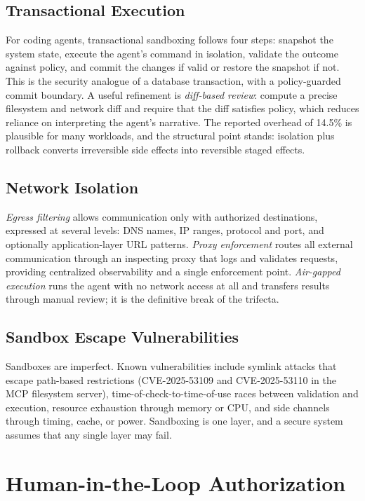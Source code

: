 \documentclass[11pt]{book}
\begin{document}
\subsection{Transactional Execution}

For coding agents, transactional sandboxing \cite{sandbox2025} follows four steps: snapshot the system state, execute the agent's command in isolation, validate the outcome against policy, and commit the changes if valid or restore the snapshot if not. This is the security analogue of a database transaction, with a policy-guarded commit boundary. A useful refinement is \textit{diff-based review}: compute a precise filesystem and network diff and require that the diff satisfies policy, which reduces reliance on interpreting the agent's narrative. The reported overhead of 14.5\% is plausible for many workloads, and the structural point stands: isolation plus rollback converts irreversible side effects into reversible staged effects.

\subsection{Network Isolation}

\textit{Egress filtering} allows communication only with authorized destinations, expressed at several levels: DNS names, IP ranges, protocol and port, and optionally application-layer URL patterns. \textit{Proxy enforcement} routes all external communication through an inspecting proxy that logs and validates requests, providing centralized observability and a single enforcement point. \textit{Air-gapped execution} runs the agent with no network access at all and transfers results through manual review; it is the definitive break of the trifecta.

\subsection{Sandbox Escape Vulnerabilities}

Sandboxes are imperfect. Known vulnerabilities include symlink attacks that escape path-based restrictions (CVE-2025-53109 and CVE-2025-53110 in the MCP filesystem server), time-of-check-to-time-of-use races between validation and execution, resource exhaustion through memory or CPU, and side channels through timing, cache, or power. Sandboxing is one layer, and a secure system assumes that any single layer may fail.

\section{Human-in-the-Loop Authorization}
\end{document}
